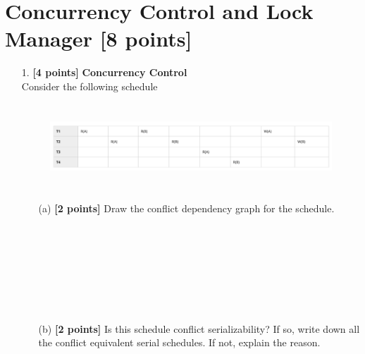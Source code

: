 \documentclass[10pt]{article}
\begin{document}
\newpage
\section{Concurrency Control and Lock Manager \textbf{[8 points]}}
\begin{enumerate}
    \item[1.] \textbf{[4 points]} \textbf{Concurrency Control} \\
        Consider the following schedule
        \begin{figure}[h]
            \centering\includegraphics[height=3.2cm]{conflict.png}
        \end{figure}
        \begin{enumerate}
            \item[(a)] \textbf{[2 points]} Draw the conflict dependency graph for the schedule.\\ \\ \\ \\ \\ \\ \\ \\
            \item[(b)] \textbf{[2 points]} Is this schedule conflict serializability? If so, write down all the conflict equivalent serial schedules. If not, explain the reason.  \\ \\ \\ \\ \\ \\ \\
        \end{enumerate}


\end{enumerate}
\end{document}
